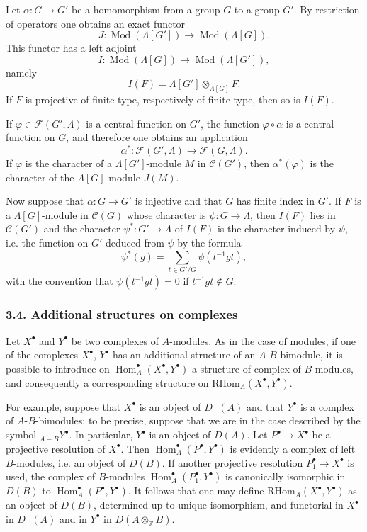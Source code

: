 \documentclass[11pt]{article}
\DeclareMathOperator{\Hom}{Hom}
\providecommand{\RHom}{\mathrm{RHom}}
\providecommand{\RHom}{\mathrm{RHom}}
\providecommand{\Hom}{\operatorname{Hom}}
\providecommand{\RHom}{\mathrm R\mathcal{H}om}
\providecommand{\Mod}{\operatorname{Mod}}
\providecommand{\RHom}{\mathrm{RHom}}
\providecommand{\Hom}{\operatorname{Hom}}
\begin{document}
Let $\alpha:G\to G'$ be a homomorphism from a group $G$ to a group $G'$. By restriction of operators one obtains an exact functor
\[
J:\Mod(\Lambda[G'])\longrightarrow\Mod(\Lambda[G]).
\]
This functor has a left adjoint
\[
I:\Mod(\Lambda[G])\longrightarrow\Mod(\Lambda[G']),
\]
namely
\[
I(F)=\Lambda[G']\otimes_{\Lambda[G]}F.
\]
If $F$ is projective of finite type, respectively of finite type, then so is $I(F)$.

If $\varphi\in\mathcal F(G',\Lambda)$ is a central function on $G'$, the function $\varphi\circ\alpha$ is a central function on $G$, and therefore one obtains an application
\[
\alpha^*: \mathcal F(G',\Lambda)\longrightarrow\mathcal F(G,\Lambda).
\]
If $\varphi$ is the character of a $\Lambda[G']$-module $M$ in $\mathcal C(G')$, then $\alpha^*(\varphi)$ is the character of the $\Lambda[G]$-module $J(M)$.

Now suppose that $\alpha:G\to G'$ is injective and that $G$ has finite index in $G'$. If $F$ is a $\Lambda[G]$-module in $\mathcal C(G)$ whose character is $\psi:G\to\Lambda$, then $I(F)$ lies in $\mathcal C(G')$ and the character $\psi^*:G'\to\Lambda$ of $I(F)$ is the character induced by $\psi$, i.e. the function on $G'$ deduced from $\psi$ by the formula
\[
\psi^*(g)=\sum_{t\in G'/G}\psi(t^{-1}gt),
\tag{3.3.1}\label{sga5:X:equation:3.3.1}
\]
with the convention that $\psi(t^{-1}gt)=0$ if $t^{-1}gt\notin G$.

\subsubsection*{3.4. Additional structures on complexes}\label{sga5:X:subsubsection:3.4}

Let $X^\bullet$ and $Y^\bullet$ be two complexes of $A$-modules. As in the case of modules, if one of the complexes $X^\bullet$, $Y^\bullet$ has an additional structure of an $A$-$B$-bimodule, it is possible to introduce on $\Hom_A^\bullet(X^\bullet,Y^\bullet)$ a structure of complex of $B$-modules, and consequently a corresponding structure on $\RHom_A(X^\bullet,Y^\bullet)$.

For example, suppose that $X^\bullet$ is an object of $D^-(A)$ and that $Y^\bullet$ is a complex of $A$-$B$-bimodules; to be precise, suppose that we are in the case described by the symbol ${}_{A-B}Y^\bullet$. In particular, $Y^\bullet$ is an object of $D(A)$. Let $P^\bullet\to X^\bullet$ be a projective resolution of $X^\bullet$. Then $\Hom_A^\bullet(P^\bullet,Y^\bullet)$ is evidently a complex of left $B$-modules, i.e. an object of $D(B)$. If another projective resolution $P_1^\bullet\to X^\bullet$ is used, the complex of $B$-modules $\Hom_A^\bullet(P_1^\bullet,Y^\bullet)$ is canonically isomorphic in $D(B)$ to $\Hom_A^\bullet(P^\bullet,Y^\bullet)$. It follows that one may define $\RHom_A(X^\bullet,Y^\bullet)$ as an object of $D(B)$, determined up to unique isomorphism, and functorial in $X^\bullet$ in $D^-(A)$ and in $Y^\bullet$ in $D(A\otimes_{\mathbb Z}B)$.
\end{document}
